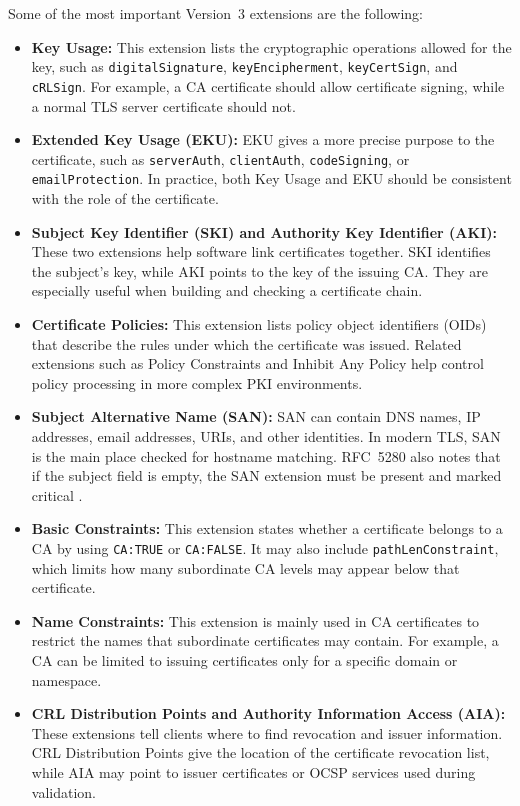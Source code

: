 \documentclass[10pt,twocolumn]{article}
\begin{document}
Some of the most important Version~3 extensions are the following:

\begin{itemize}
  \item \textbf{Key Usage:} This extension lists the cryptographic operations
        allowed for the key, such as \texttt{digitalSignature},
        \texttt{keyEncipherment}, \texttt{keyCertSign}, and
        \texttt{cRLSign}. For example, a CA certificate should allow
        certificate signing, while a normal TLS server certificate should not.
  \item \textbf{Extended Key Usage (EKU):} EKU gives a more precise purpose to
        the certificate, such as \texttt{serverAuth}, \texttt{clientAuth},
        \texttt{codeSigning}, or \texttt{emailProtection}. In practice, both
        Key Usage and EKU should be consistent with the role of the
        certificate.
  \item \textbf{Subject Key Identifier (SKI) and Authority Key Identifier
        (AKI):} These two extensions help software link certificates together.
        SKI identifies the subject's key, while AKI points to the key of the
        issuing CA. They are especially useful when building and checking a
        certificate chain.
  \item \textbf{Certificate Policies:} This extension lists policy object
        identifiers (OIDs) that describe the rules under which the certificate
        was issued. Related extensions such as Policy Constraints and Inhibit
        Any Policy help control policy processing in more complex PKI
        environments.
  \item \textbf{Subject Alternative Name (SAN):} SAN can contain DNS names, IP
        addresses, email addresses, URIs, and other identities. In modern TLS,
        SAN is the main place checked for hostname matching. RFC~5280 also
        notes that if the subject field is empty, the SAN extension must be
        present and marked critical \cite{rfc5280}.
  \item \textbf{Basic Constraints:} This extension states whether a
        certificate belongs to a CA by using \texttt{CA:TRUE} or
        \texttt{CA:FALSE}. It may also include
        \texttt{pathLenConstraint}, which limits how many subordinate CA
        levels may appear below that certificate.
  \item \textbf{Name Constraints:} This extension is mainly used in CA
        certificates to restrict the names that subordinate certificates may
        contain. For example, a CA can be limited to issuing certificates only
        for a specific domain or namespace.
  \item \textbf{CRL Distribution Points and Authority Information Access
        (AIA):} These extensions tell clients where to find revocation and
        issuer information. CRL Distribution Points give the location of the
        certificate revocation list, while AIA may point to issuer
        certificates or OCSP services used during validation.
\end{itemize}
\end{document}
